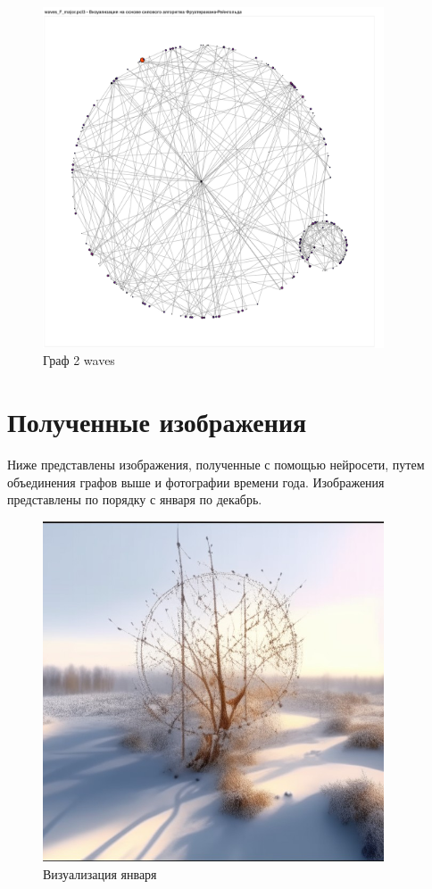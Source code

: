 \begin{figure}[H]
	\caption{Граф 2 waves}
	\includegraphics[width=0.9\textwidth]{img/waves2.pdf}
\end{figure}

\section{Полученные изображения}

Ниже представлены изображения, полученные с помощью нейросети, путем объединения графов выше и фотографии времени года. Изображения представлены по порядку с января по декабрь.

\begin{figure}[H]
	\caption{Визуализация января}
	\includegraphics[width=0.9\textwidth]{img/jan.jpeg}
\end{figure}

